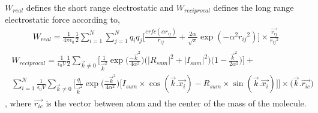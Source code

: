\documentclass[letterpaper,10pt,english]{sphinxmanual}
\begin{document}
\begin{description}
\sphinxAtStartPar
\(W_{real}\) defines the short range electrostatic and \(W_{reciprocal}\) defines the long range electrostatic force according to,
\begin{equation*}
\begin{split}W_{real} = \frac{1}{4\pi \epsilon_0} \frac{1}{2} \sum_{i =1}^{N} \sum_{j = 1}^{N} q_i q_j  \bigg[ \frac{erfc(\alpha r_{ij})}{r_{ij}} + \frac{2\alpha}{ \sqrt{\pi}} \exp(-\alpha^2 {r_{ij}}^2) \bigg] \times \frac{\overrightarrow{r_{ij}}}{{r_{ij}}^2}\end{split}
\end{equation*}\begin{equation*}
\begin{split}\begin{split}
              W_{reciprocal} = \frac{1}{\epsilon_0 V} \frac {1}{2} \sum_{\overrightarrow{k} \ne 0}^{} \Bigg[\frac {1}{\overrightarrow{k}^2}\exp\bigg(\frac {-\overrightarrow{k}^2}{4 \alpha^2}\bigg) \bigg( {\Big| R_{sum} \Big|}^2 + {\Big| I_{sum} \Big|}^2 \bigg) \bigg(  1 - \frac{\overrightarrow{k}^2}{2\alpha^2} \bigg) \Bigg] +\\
  \sum_{i=1}^{N} \frac{1}{\epsilon_0 V}  \sum_{\overrightarrow{k} \ne 0}^{} \Bigg[ \frac {q_i}{\overrightarrow{k}^2}\exp\bigg(\frac {-\overrightarrow{k}^2}{4 \alpha^2}\bigg) \bigg[ I_{sum} \times\cos(\overrightarrow{k}.\overrightarrow{x_i})  - R_{sum} \times \sin(\overrightarrow{k}.\overrightarrow{x_i}) \bigg] \Bigg] \times \big( \overrightarrow{k}.\overrightarrow{r_{ic}} \big)
      \end{split}\end{split}
\end{equation*}
\sphinxAtStartPar
, where \(\overrightarrow{r_{ic}}\) is the vector between atom and the center of the mass of the molecule.

\end{description}
\end{document}

